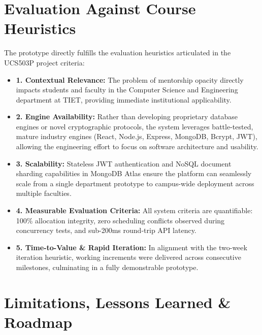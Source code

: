\documentclass[11pt,a4paper]{article}
\begin{document}
\section{Evaluation Against Course Heuristics}
The prototype directly fulfills the evaluation heuristics articulated in the UCS503P project criteria:
\begin{itemize}[leftmargin=1.4em, itemsep=0.3em]
  \item \textbf{1. Contextual Relevance:} The problem of mentorship opacity directly impacts students and faculty in the Computer Science and Engineering department at TIET, providing immediate institutional applicability.
  \item \textbf{2. Engine Availability:} Rather than developing proprietary database engines or novel cryptographic protocols, the system leverages battle-tested, mature industry engines (React, Node.js, Express, MongoDB, Bcrypt, JWT), allowing the engineering effort to focus on software architecture and usability.
  \item \textbf{3. Scalability:} Stateless JWT authentication and NoSQL document sharding capabilities in MongoDB Atlas ensure the platform can seamlessly scale from a single department prototype to campus-wide deployment across multiple faculties.
  \item \textbf{4. Measurable Evaluation Criteria:} All system criteria are quantifiable: 100\% allocation integrity, zero scheduling conflicts observed during concurrency tests, and sub-200ms round-trip API latency.
  \item \textbf{5. Time-to-Value \& Rapid Iteration:} In alignment with the two-week iteration heuristic, working increments were delivered across consecutive milestones, culminating in a fully demonstrable prototype.
\end{itemize}

\section{Limitations, Lessons Learned \& Roadmap}
\end{document}
